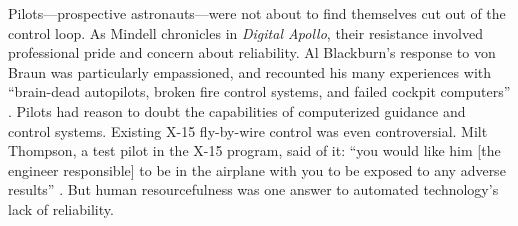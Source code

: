 Pilots---prospective astronauts---were not about to find themselves
cut out of the control loop. As Mindell chronicles in \emph{Digital
  Apollo}, their resistance involved professional pride and concern
about reliability. Al Blackburn's response to von Braun was
particularly empassioned, and recounted his many experiences with 
``brain-dead autopilots, broken fire control systems, and failed cockpit
computers'' \cite[p. 68]{DM}. Pilots had  
reason to doubt the capabilities of computerized guidance and
control systems. Existing X-15 fly-by-wire control \cite{hypersonics} was even
  controversial. Milt Thompson, a test pilot in the X-15 program, said
  of it: ``you would like him [the engineer responsible] to be in the
airplane with you to be exposed to any adverse results'' \cite[p.
  55]{DM}. But human resourcefulness was one answer to automated
technology's lack of reliability. 





